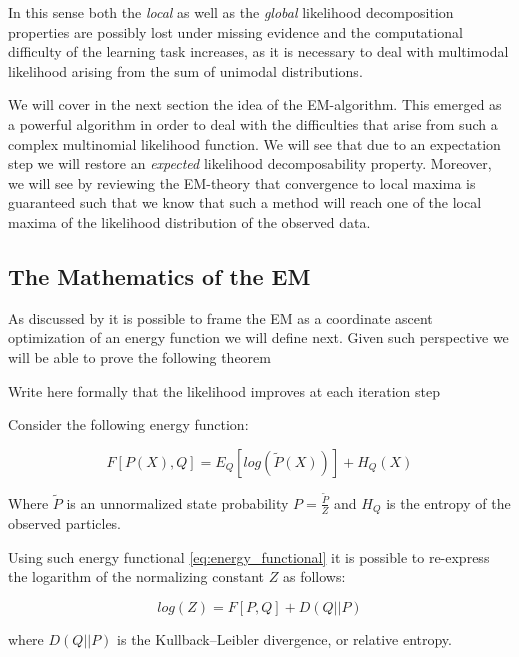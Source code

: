 \documentclass[11pt]{article}
\begin{document}
\begin{article}
In this sense both the \emph{local} as well as the \emph{global} likelihood
decomposition properties are possibly lost under missing evidence
and the computational difficulty of the learning task increases, as
it is necessary to deal with multimodal likelihood arising from the
sum of unimodal distributions.

We will cover in the next section the idea of the
EM-algorithm. This emerged as a powerful algorithm in order to deal
with the difficulties that arise from such a complex multinomial
likelihood function. We will see that due to an expectation step we
will restore an \emph{expected} likelihood decomposability
property. Moreover, we will see by reviewing the EM-theory that
convergence to local maxima is guaranteed such that we know that
such a method will reach one of the local maxima of the likelihood
distribution of the observed data.


\subsection{The Mathematics of the EM}
\label{math_em}
As discussed by \cite{koller2009probabilistic} it is possible to frame
the EM as a coordinate ascent optimization of an energy function we
will define next. Given such perspective we will be able to prove the
following theorem

\begin{theorem}\label{thm:one}
Write here formally that the likelihood improves at each iteration step
\end{theorem}

Consider the following energy function:

\begin{equation} \label{eq:energy_functional}
F[P(X), Q] = E_Q[log (\tilde{P}(X))] + H_Q (X)
\end{equation}

Where \(\tilde{P}\) is an unnormalized state probability \(P =
   \frac{\tilde{P}}{Z}\) and \(H_Q\) is the entropy of the observed
particles. 

Using such energy functional \ref{eq:energy_functional} it is possible
to re-express the logarithm of the normalizing constant \(Z\) as
follows:

\begin{equation} \label{eq:energy_refurmolation}
log (Z) = F[P, Q] + D (Q||P)
\end{equation}  

where \(D(Q||P)\) is the Kullback–Leibler divergence, or relative
entropy.


\end{article}
\end{document}
